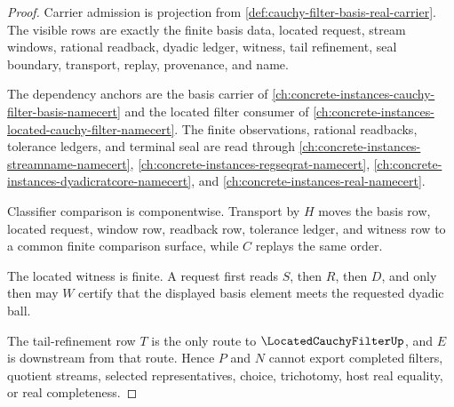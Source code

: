 \begin{proof}
Carrier admission is projection from \autoref{def:cauchy-filter-basis-real-carrier}. The visible rows are exactly the finite basis data, located request, stream windows, rational readback, dyadic ledger, witness, tail refinement, seal boundary, transport, replay, provenance, and name.

The dependency anchors are the basis carrier of \autoref{ch:concrete-instances-cauchy-filter-basis-namecert} and the located filter consumer of \autoref{ch:concrete-instances-located-cauchy-filter-namecert}. The finite observations, rational readbacks, tolerance ledgers, and terminal seal are read through \autoref{ch:concrete-instances-streamname-namecert}, \autoref{ch:concrete-instances-regseqrat-namecert}, \autoref{ch:concrete-instances-dyadicratcore-namecert}, and \autoref{ch:concrete-instances-real-namecert}.

Classifier comparison is componentwise. Transport by $H$ moves the basis row, located request, window row, readback row, tolerance ledger, and witness row to a common finite comparison surface, while $C$ replays the same order.

The located witness is finite. A request first reads $S$, then $R$, then $D$, and only then may $W$ certify that the displayed basis element meets the requested dyadic ball.

The tail-refinement row $T$ is the only route to $\LocatedCauchyFilterUp$, and $E$ is downstream from that route. Hence $P$ and $N$ cannot export completed filters, quotient streams, selected representatives, choice, trichotomy, host real equality, or real completeness.
\end{proof}

